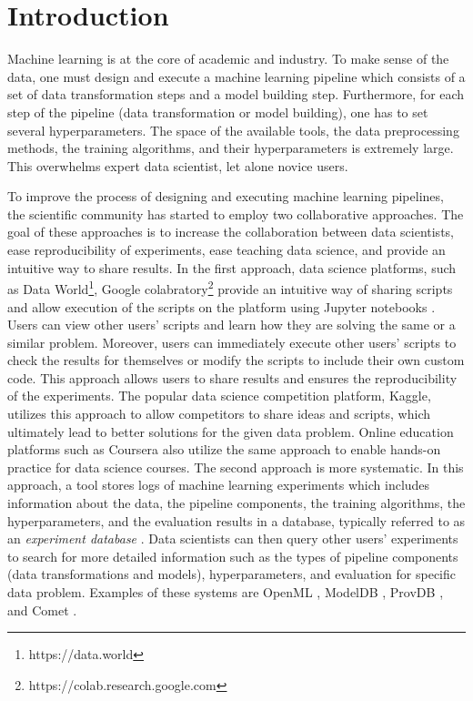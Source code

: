 \section{Introduction} \label{sec-introduction}
Machine learning is at the core of academic and industry.
To make sense of the data, one must design and execute a machine learning pipeline which consists of a set of data transformation steps and a model building step.
Furthermore, for each step of the pipeline (data transformation or model building), one has to set several hyperparameters.
The space of the available tools, the data preprocessing methods, the training algorithms, and their hyperparameters is extremely large.
This overwhelms expert data scientist, let alone novice users.

To improve the process of designing and executing machine learning pipelines, the scientific community has started to employ two collaborative approaches.
The goal of these approaches is to increase the collaboration between data scientists, ease reproducibility of experiments, ease teaching data science, and provide an intuitive way to share results.
In the first approach, data science platforms, such as Data World\footnote{https://data.world}, Google colabratory\footnote{https://colab.research.google.com} provide an intuitive way of sharing scripts and allow execution of the scripts on the platform using Jupyter notebooks \cite{Kluyver:2016aa}. 
Users can view other users' scripts and learn how they are solving the same or a similar problem.
Moreover, users can immediately execute other users' scripts to check the results for themselves or modify the scripts to include their own custom code.
This approach allows users to share results and ensures the reproducibility of the experiments.
The popular data science competition platform, Kaggle, utilizes this approach to allow competitors to share ideas and scripts, which ultimately lead to better solutions for the given data problem.
Online education platforms such as Coursera also utilize the same approach to enable hands-on practice for data science courses.
The second approach is more systematic.
In this approach, a tool stores logs of machine learning experiments which includes information about the data, the pipeline components, the training algorithms, the hyperparameters, and the evaluation results in a database, typically referred to as an \textit{experiment database} \cite{Vanschoren2012}.
Data scientists can then query other users' experiments to search for more detailed information such as the types of pipeline components (data transformations and models), hyperparameters, and evaluation for specific data problem.
Examples of these systems are OpenML \cite{vanschoren2014openml}, ModelDB \cite{vartak2016m}, ProvDB \cite{miao2018provdb}, and Comet \cite{cometml}.

